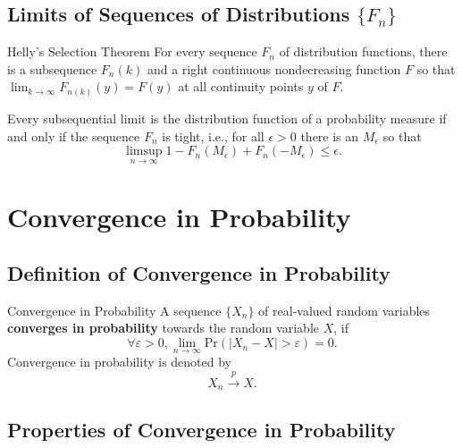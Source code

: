 \subsection{Limits of Sequences of Distributions $\{F_n\}$}

\begin{theorem}{Helly's Selection Theorem}{}
    For every sequence $F_{n}$ of distribution functions, there is a subsequence $F_{n}(k)$ and a right continuous nondecreasing function $F$ so that $\lim_{k\rightarrow\infty}F_{n(k)}(y)=F(y)$ at all continuity points $y$ of $F$.
\end{theorem}

\begin{theorem}{}{}
    Every subsequential limit is the distribution function of a probability measure if and only if the sequence $F_{n}$ is tight, i.e., for all $\epsilon>0$ there is an $M_{\epsilon}$ so that
    \begin{equation}
        \limsup_{n\rightarrow\infty}1-F_{n}\left(M_{\epsilon}\right)+F_{n}\left(-M_{\epsilon}\right)\leq\epsilon.
    \end{equation}
\end{theorem}

\section{Convergence in Probability}

\subsection{Definition of Convergence in Probability}

\begin{definition}{Convergence in Probability}{}
    A sequence $\{X_n\}$ of real-valued random variables \textbf{converges in probability} towards the random variable $X$, if
    \begin{equation}
        \forall \varepsilon > 0, \lim_{n\to\infty}\text{Pr}\left(|X_n-X|>\varepsilon\right)=0.
    \end{equation}
    Convergence in probability is denoted by
    \begin{equation}
        X_n \stackrel{p}{\rightarrow} X.
    \end{equation}
\end{definition}

\subsection{Properties of Convergence in Probability}

